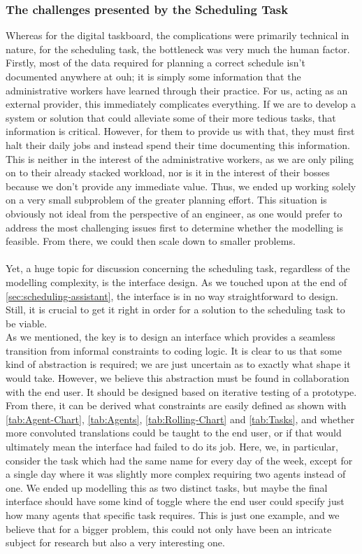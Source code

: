 \subsubsection*{The challenges presented by the Scheduling Task}
Whereas for the digital taskboard, the complications were primarily technical in nature, for the scheduling task, the bottleneck was very much the human factor.
\\
Firstly, most of the data required for planning a correct schedule isn't documented anywhere at \acrshort{ouh}; it is simply some information that the administrative workers have learned through their practice. For us, acting as an external provider, this immediately complicates everything. If we are to develop a system or solution that could alleviate some of their more tedious tasks, that information is critical. However, for them to provide us with that, they must first halt their daily jobs and instead spend their time documenting this information. This is neither in the interest of the administrative workers, as we are only piling on to their already stacked workload, nor is it in the interest of their bosses because we don't provide any immediate value. Thus, we ended up working solely on a very small subproblem of the greater planning effort. This situation is obviously not ideal from the perspective of an engineer, as one would prefer to address the most challenging issues first to determine whether the modelling is feasible. From there, we could then scale down to smaller problems.
\\
\\
Yet, a huge topic for discussion concerning the scheduling task, regardless of the modelling complexity, is the interface design. As we touched upon at the end of \autoref{sec:scheduling-assistant}, the interface is in no way straightforward to design. Still, it is crucial to get it right in order for a solution to the scheduling task to be viable. 
\\
As we mentioned, the key is to design an interface which provides a seamless transition from informal constraints to coding logic. It is clear to us that some kind of abstraction is required; we are just uncertain as to exactly what shape it would take. However, we believe this abstraction must be found in collaboration with the end user. It should be designed based on iterative testing of a prototype. From there, it can be derived what constraints are easily defined as shown with \autoref{tab:Agent-Chart}, \autoref{tab:Agents}, \autoref{tab:Rolling-Chart} and \autoref{tab:Tasks}, and whether more convoluted translations could be taught to the end user, or if that would ultimately mean the interface had failed to do its job. Here, we, in particular, consider the task which had the same name for every day of the week, except for a single day where it was slightly more complex requiring two agents instead of one. We ended up modelling this as two distinct tasks, but maybe the final interface should have some kind of toggle where the end user could specify just how many agents that specific task requires. This is just one example, and we believe that for a bigger problem, this could not only have been an intricate subject for research but also a very interesting one.

